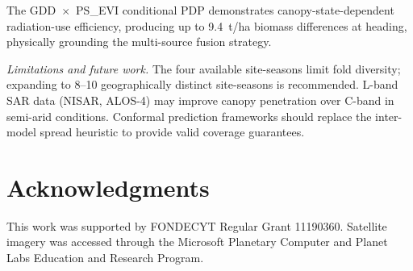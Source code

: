 \documentclass[lettersize,journal]{IEEEtran}
\begin{document}
The GDD~$\times$~PS\_EVI conditional PDP demonstrates canopy-state-dependent
radiation-use efficiency, producing up to 9.4~t/ha biomass differences at
heading, physically grounding the multi-source fusion strategy.

\textit{Limitations and future work.} The four available site-seasons limit
fold diversity; expanding to 8--10 geographically distinct site-seasons is
recommended. L-band SAR data (NISAR, ALOS-4) may improve canopy penetration
over C-band in semi-arid conditions. Conformal prediction frameworks should
replace the inter-model spread heuristic to provide valid coverage guarantees.

\section*{Acknowledgments}

This work was supported by FONDECYT Regular Grant 11190360. Satellite imagery
was accessed through the Microsoft Planetary Computer and Planet Labs
Education and Research Program.
\end{document}
